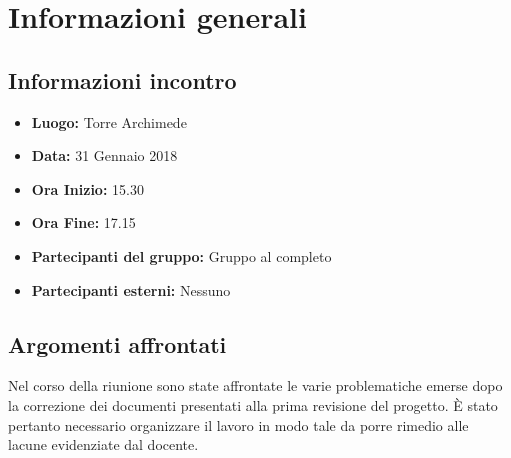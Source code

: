 \documentclass[a4paper, oneside, openany]{article}
\begin{document}
	\section{Informazioni generali}
		\subsection{Informazioni incontro}
			\begin{itemize}
				\item { \textbf{Luogo:} Torre Archimede }
				\item { \textbf{Data:} 31 Gennaio 2018 }
				\item { \textbf{Ora Inizio:} 15.30 }
					\item { \textbf{Ora Fine:} 17.15 }
				\item { \textbf{Partecipanti del gruppo:} Gruppo al completo }
				\item { \textbf{Partecipanti esterni:} Nessuno }
			\end{itemize}
		
	
	\subsection{Argomenti affrontati}
    Nel corso della riunione sono state affrontate le varie problematiche emerse dopo la correzione dei documenti presentati alla prima revisione del progetto. È stato pertanto necessario organizzare il lavoro in modo tale da porre rimedio alle lacune evidenziate dal docente.
    
\end{document}
